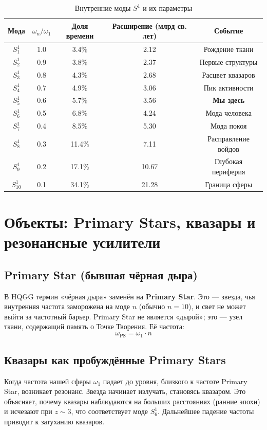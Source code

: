\documentclass[12pt,a4paper]{article}
\begin{document}
\begin{table}[h]
\centering
\caption{Внутренние моды \( S^1 \) и их параметры}
\begin{tabular}{c|c|c|c|c}
\toprule
\textbf{Мода} & \(\omega_n / \omega_1\) & \textbf{Доля времени} & \textbf{Расширение (млрд св. лет)} & \textbf{Событие} \\
\midrule
\(S^1_1\) & 1.0 & 3.4\% & 2.12 & Рождение ткани \\
\(S^1_2\) & 0.9 & 3.8\% & 2.37 & Первые структуры \\
\(S^1_3\) & 0.8 & 4.3\% & 2.68 & Расцвет квазаров \\
\(S^1_4\) & 0.7 & 4.9\% & 3.06 & Пик активности \\
\(S^1_5\) & 0.6 & 5.7\% & 3.56 & \textbf{Мы здесь} \\
\(S^1_6\) & 0.5 & 6.8\% & 4.24 & Мода человека \\
\(S^1_7\) & 0.4 & 8.5\% & 5.30 & Мода покоя \\
\(S^1_8\) & 0.3 & 11.4\% & 7.11 & Расправление войдов \\
\(S^1_9\) & 0.2 & 17.1\% & 10.67 & Глубокая периферия \\
\(S^1_{10}\) & 0.1 & 34.1\% & 21.28 & Граница сферы \\
\bottomrule
\end{tabular}
\end{table}

\section{Объекты: Primary Stars, квазары и резонансные усилители}

\subsection{Primary Star (бывшая чёрная дыра)}

В HQGG термин «чёрная дыра» заменён на \textbf{Primary Star}. Это — звезда, чья внутренняя частота заморожена на моде \( n \) (обычно \( n=10 \)), и свет не может выйти за частотный барьер. Primary Star не является «дырой»; это — узел ткани, содержащий память о Точке Творения. Её частота:
\[
\omega_{\text{PS}} = \omega_1 \cdot n
\]

\subsection{Квазары как пробуждённые Primary Stars}

Когда частота нашей сферы \(\omega_1\) падает до уровня, близкого к частоте Primary Star, возникает резонанс. Звезда начинает излучать, становясь квазаром. Это объясняет, почему квазары наблюдаются на больших расстояниях (ранние эпохи) и исчезают при \(z \sim 3\), что соответствует моде \( S^1_6 \). Дальнейшее падение частоты приводит к затуханию квазаров.
\end{document}
